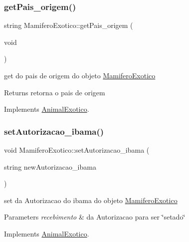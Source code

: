 \subsubsection{\texorpdfstring{getPais\_origem()}{getPais\_origem()}}
{\footnotesize\ttfamily string Mamifero\+Exotico\+::get\+Pais\+\_\+origem (\begin{DoxyParamCaption}\item[{void}]{ }\end{DoxyParamCaption})\hspace{0.3cm}{\ttfamily [virtual]}}



get do pais de origem do objeto \mbox{\hyperlink{class_mamifero_exotico}{Mamifero\+Exotico}} 

\begin{DoxyReturn}{Returns}
retorna o pais de origem 
\end{DoxyReturn}


Implements \mbox{\hyperlink{class_animal_exotico}{Animal\+Exotico}}.

\mbox{\label{class_mamifero_exotico_abd667d2810b3aaa7b075435312b6e571}} 
\subsubsection{\texorpdfstring{setAutorizacao\_ibama()}{setAutorizacao\_ibama()}}
{\footnotesize\ttfamily void Mamifero\+Exotico\+::set\+Autorizacao\+\_\+ibama (\begin{DoxyParamCaption}\item[{string}]{new\+Autorizacao\+\_\+ibama }\end{DoxyParamCaption})\hspace{0.3cm}{\ttfamily [virtual]}}



set da Autorizacao do ibama do objeto \mbox{\hyperlink{class_mamifero_exotico}{Mamifero\+Exotico}} 


\begin{DoxyParams}{Parameters}
{\em recebimento} & da Autorizacao para ser \char`\"{}setado\char`\"{} \\
\hline
\end{DoxyParams}


Implements \mbox{\hyperlink{class_animal_exotico_a3931a6cc8ae2d7d8e1efd6e399a63bf7}{Animal\+Exotico}}.

